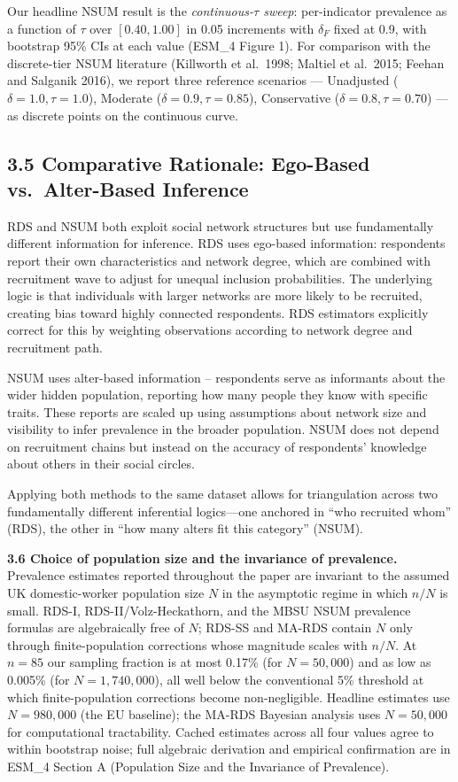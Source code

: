 \documentclass[
  12pt,
  letterpaper,
  DIV=11,
  numbers=noendperiod]{scrartcl}
\begin{document}
Our headline NSUM result is the \emph{continuous-\(\tau\) sweep}:
per-indicator prevalence as a function of \(\tau\) over \([0.40, 1.00]\)
in 0.05 increments with \(\delta_F\) fixed at 0.9, with bootstrap 95\%
CIs at each value (ESM\_4 Figure 1). For comparison with the
discrete-tier NSUM literature (Killworth et al.~1998; Maltiel et
al.~2015; Feehan and Salganik 2016), we report three reference scenarios
--- Unadjusted (\(\delta = 1.0, \tau = 1.0\)), Moderate
(\(\delta = 0.9, \tau = 0.85\)), Conservative
(\(\delta = 0.8, \tau = 0.70\)) --- as discrete points on the continuous
curve.

\subsection{3.5 Comparative Rationale: Ego-Based vs.~Alter-Based
Inference}\label{comparative-rationale-ego-based-vs.-alter-based-inference}

RDS and NSUM both exploit social network structures but use
fundamentally different information for inference. RDS uses ego-based
information: respondents report their own characteristics and network
degree, which are combined with recruitment wave to adjust for unequal
inclusion probabilities. The underlying logic is that individuals with
larger networks are more likely to be recruited, creating bias toward
highly connected respondents. RDS estimators explicitly correct for this
by weighting observations according to network degree and recruitment
path.

NSUM uses alter-based information -- respondents serve as informants
about the wider hidden population, reporting how many people they know
with specific traits. These reports are scaled up using assumptions
about network size and visibility to infer prevalence in the broader
population. NSUM does not depend on recruitment chains but instead on
the accuracy of respondents' knowledge about others in their social
circles.

Applying both methods to the same dataset allows for triangulation
across two fundamentally different inferential logics---one anchored in
``who recruited whom'' (RDS), the other in ``how many alters fit this
category'' (NSUM).

\textbf{3.6 Choice of population size and the invariance of prevalence.}
Prevalence estimates reported throughout the paper are invariant to the
assumed UK domestic-worker population size \(N\) in the asymptotic
regime in which \(n/N\) is small. RDS-I, RDS-II/Volz-Heckathorn, and the
MBSU NSUM prevalence formulas are algebraically free of \(N\); RDS-SS
and MA-RDS contain \(N\) only through finite-population corrections
whose magnitude scales with \(n/N\). At \(n = 85\) our sampling fraction
is at most 0.17\% (for \(N = 50{,}000\)) and as low as 0.005\% (for
\(N = 1{,}740{,}000\)), all well below the conventional 5\% threshold at
which finite-population corrections become non-negligible. Headline
estimates use \(N = 980{,}000\) (the EU baseline); the MA-RDS Bayesian
analysis uses \(N = 50{,}000\) for computational tractability. Cached
estimates across all four values agree to within bootstrap noise; full
algebraic derivation and empirical confirmation are in ESM\_4 Section A
(Population Size and the Invariance of Prevalence).
\end{document}
